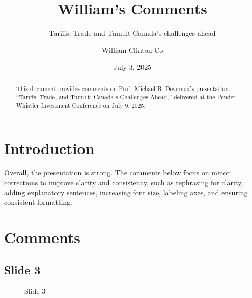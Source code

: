 \documentclass[
  11pt,
]{article}
\title{William's Comments}
\subtitle{Tariffs, Trade and Tumult Canada's challenges ahead}
\author{William Clinton Co}
\date{July 3, 2025}
\renewcommand*\contentsname{Table of contents}
\newcommand\contentsname{Table of contents}
\begin{document}
\maketitle
\begin{abstract}
This document provides comments on Prof.~Michael B. Devereux's
presentation, ``Tariffs, Trade, and Tumult: Canada's Challenges Ahead,''
delivered at the Pender Whistler Investment Conference on July 9, 2025.
\end{abstract}

\renewcommand*\contentsname{Table of contents}
{
\hypersetup{linkcolor=}
\setcounter{tocdepth}{3}
\tableofcontents
}

\section{Introduction}\label{sec-introduction}

Overall, the presentation is strong. The comments below focus on minor
corrections to improve clarity and consistency, such as rephrasing for
clarity, adding explanatory sentences, increasing font size, labeling
axes, and ensuring consistent formatting.

\section{Comments}\label{comments}

\subsection{Slide 3}\label{slide-3}

\begin{figure}


\caption{\label{fig-slide3}Slide 3}

\end{figure}%
\end{document}
